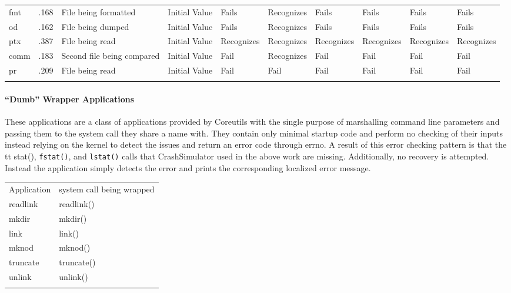 \begin{table*}[t]
\begin{tabular}{l  l  l  l  l  l  l  l  l}
          fmt         & .168                             & File being formatted       & Initial Value  & Fails          & Recognizes  & Fails      & Fails       & Fails      & Fails\\
          od          & .162                             & File being dumped          & Initial Value  & Fails          & Recognizes  & Fails      & Fails       & Fails      & Fails\\
          ptx         & .387                             & File being read            & Initial Value  & Recognizes     & Recognizes  & Recognizes & Recognizes  & Recognizes & Recognizes\\
          comm        & .183                             & Second file being compared & Initial Value  & Fail           & Recognizes  & Fail       & Fail        & Fail       & Fail\\
          pr          & .209                             & File being read            & Initial Value  & Fail           & Fail        & Fail       & Fail        & Fail       & Fail\\
        \bottomrule{}
        \end{tabular}
    \end{table*}


\paragraph{``Dumb'' Wrapper Applications}

These applications are a class of applications provided by Coreutils with the single purpose of marshalling
command line parameters and passing them to the system call they share a name with.  They contain only minimal startup
code and perform no checking of their inputs instead relying on the kernel to detect the issues and return an error code
through errno.  A result of this error checking pattern is that the {\\tt stat()}, {\tt fstat()}, and {\tt lstat()}
calls that CrashSimulator used in the above work are missing.  Additionally, no recovery is attempted.  Instead the
application simply detects the error and prints the corresponding localized error message.


\begin{table*}[t]
  \scriptsize{}
  \begin{tabular}{l | l}
    Application  & system call being wrapped\\
    readlink     & readlink()\\
    mkdir        & mkdir()\\
    link         & link()\\
    mknod        & mknod()\\
    truncate     & truncate()\\
    unlink       & unlink()\\
  \bottomrule{}
  \end{tabular}
\end{table*}

